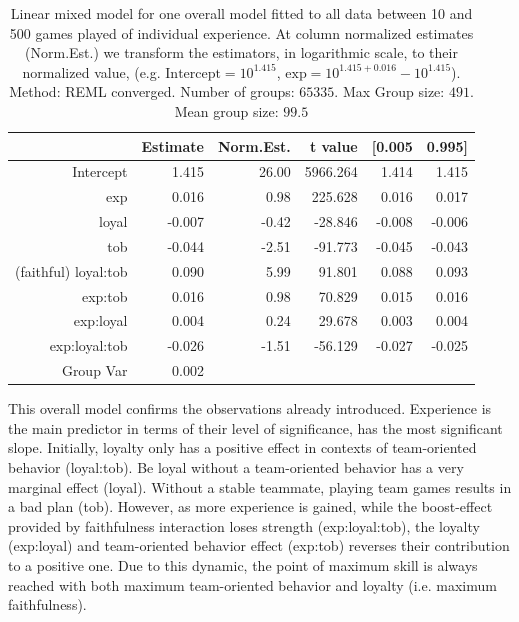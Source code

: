 \documentclass[a4paper,10pt]{book}
\theoremstyle{definition}
\begin{document}
\begin{table}[ht!]
\centering
\begin{tabular}{rrrrrr}
  
 & Estimate & Norm.Est. & t value  & [0.005 & 0.995] \\ 
  \hline
Intercept               &  1.415  &  26.00   & 5966.264  &  1.414 &  1.415 \\
exp           		&  0.016  &   0.98   &  225.628  &  0.016 &  0.017 \\
loyal         		& -0.007  &  -0.42   &  -28.846  & -0.008 & -0.006 \\
tob           		& -0.044  &  -2.51   &  -91.773  & -0.045 & -0.043 \\
(faithful) loyal:tob    &  0.090  &   5.99   &   91.801  &  0.088 &  0.093 \\
exp:tob       		&  0.016  &   0.98   &   70.829  &  0.015 &  0.016 \\
exp:loyal     		&  0.004  &   0.24   &   29.678  &  0.003 &  0.004 \\
exp:loyal:tob 		& -0.026  &  -1.51   &  -56.129  & -0.027 & -0.025 \\
Group Var     		&  0.002  &          &           &        &       \\   
   \hline
\end{tabular}
\caption{Linear mixed model for one overall model fitted to all data between 10 and 500 games played of individual experience. At column normalized estimates (Norm.Est.) we transform the estimators, in logarithmic scale, to their normalized value, (e.g. $\text{Intercept} = 10^{1.415}$, $\text{exp} = 10^{1.415+0.016} - 10^{1.415}$). Method: REML converged. Number of groups: $65335$. Max Group size: $491$. Mean group size: $99.5$}
\label{lmm}
\end{table}

This overall model confirms the observations already introduced.
Experience is the main predictor in terms of their level of significance, has the most significant slope.
Initially, loyalty only has a positive effect in contexts of team-oriented behavior (loyal:tob).
Be loyal without a team-oriented behavior has a very marginal effect (loyal).
Without a stable teammate, playing team games results in a bad plan (tob).
However, as more experience is gained, while the boost-effect provided by faithfulness interaction  loses strength (exp:loyal:tob), the loyalty (exp:loyal) and team-oriented behavior effect (exp:tob) reverses their contribution to a positive one.
Due to this dynamic, the point of maximum skill is always reached with both maximum team-oriented behavior and loyalty (i.e. maximum faithfulness).
\end{document}
